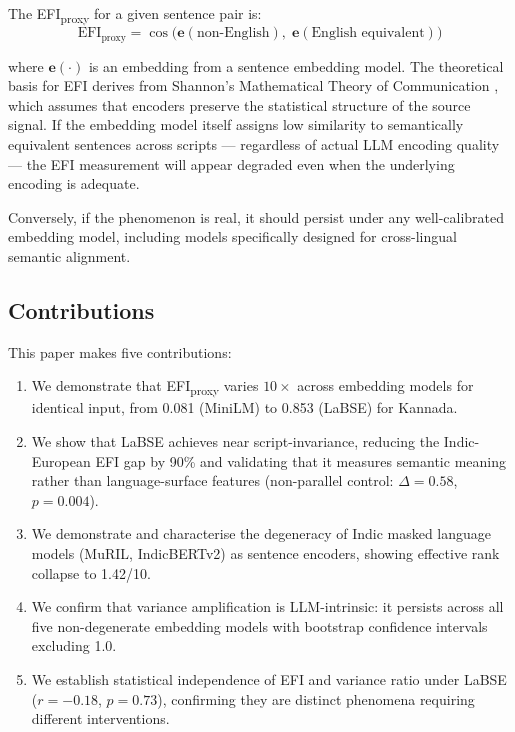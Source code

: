 \documentclass[11pt,a4paper]{article}
\begin{document}
The EFI\textsubscript{proxy} for a given sentence pair is:
\begin{equation}
    \text{EFI}_{\text{proxy}} = \cos\!\big(\mathbf{e}(\text{non-English}),\;
    \mathbf{e}(\text{English equivalent})\big)
\end{equation}

where $\mathbf{e}(\cdot)$ is an embedding from a sentence embedding model. The theoretical
basis for EFI derives from Shannon's Mathematical Theory of Communication \citep{shannon1948},
which assumes that encoders preserve the statistical structure of the source signal. If the embedding
model itself assigns low similarity to semantically equivalent sentences across scripts
--- regardless of actual LLM encoding quality --- the EFI measurement will appear degraded
even when the underlying encoding is adequate.

Conversely, if the phenomenon is real, it should persist under any well-calibrated
embedding model, including models specifically designed for cross-lingual semantic
alignment.

\subsection{Contributions}

This paper makes five contributions:

\begin{enumerate}
    \item We demonstrate that EFI\textsubscript{proxy} varies $10\times$ across embedding
    models for identical input, from 0.081 (MiniLM) to 0.853 (LaBSE) for Kannada.
    \item We show that LaBSE achieves near script-invariance, reducing the Indic-European
    EFI gap by 90\% and validating that it measures semantic meaning rather than
    language-surface features (non-parallel control: $\Delta = 0.58$, $p = 0.004$).
    \item We demonstrate and characterise the degeneracy of Indic masked language models
    (MuRIL, IndicBERTv2) as sentence encoders, showing effective rank collapse to 1.42/10.
    \item We confirm that variance amplification is LLM-intrinsic: it persists across all
    five non-degenerate embedding models with bootstrap confidence intervals excluding 1.0.
    \item We establish statistical independence of EFI and variance ratio under LaBSE
    ($r = -0.18$, $p = 0.73$), confirming they are distinct phenomena requiring different
    interventions.
\end{enumerate}
\end{document}
